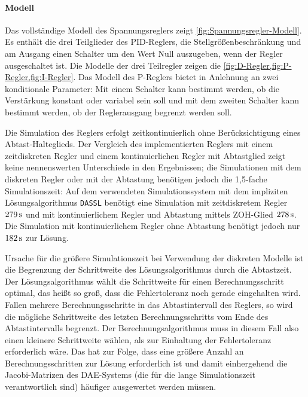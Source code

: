 \paragraph{Modell}\label{modell-Regler}
Das vollständige Modell des Spannungsreglers zeigt \cref{fig:Spannungsregler-Modell}. Es enthält die drei Teilglieder des PID-Reglers, die Stellgrößenbeschränkung und am Ausgang einen Schalter um den Wert Null auszugeben, wenn der Regler ausgeschaltet ist. Die Modelle der drei Teilregler zeigen die \cref{fig:D-Regler,fig:P-Regler,fig:I-Regler}. Das Modell des P-Reglers bietet in Anlehnung an \cite{pillerpowerssystemsDigitalerSpannungsreglerSoftwaredokumentation1997} zwei konditionale Parameter: Mit einem Schalter kann bestimmt werden, ob die Verstärkung konstant oder variabel sein soll und mit dem zweiten Schalter kann bestimmt werden, ob der Reglerausgang begrenzt werden soll. 

Die Simulation des Reglers erfolgt zeitkontinuierlich ohne Berücksichtigung eines Abtast-Halteglieds. Der Vergleich des implementierten Reglers mit einem zeitdiskreten Regler und einem kontinuierlichen Regler mit Abtastglied zeigt keine nennenswerten Unterschiede in den Ergebnissen; die Simulationen mit dem diskreten Regler oder mit der Abtastung benötigen jedoch die 1,5-fache Simulationszeit: Auf dem verwendeten Simulationssystem mit dem impliziten Lösungsalgorithmus \texttt{DASSL} benötigt eine Simulation mit zeitdiskretem Regler $\unit[279]{s}$ und mit kontinuierlichem Regler und Abtastung mittels ZOH-Glied $\unit[278]{s}$.  Die Simulation mit kontinuierlichem Regler ohne Abtastung benötigt jedoch nur $\unit[182]{s}$ zur Lösung. 

Ursache für die größere Simulationszeit bei Verwendung der diskreten Modelle ist die Begrenzung der Schrittweite des Lösungsalgorithmus durch die Abtastzeit. Der Lösungsalgorithmus wählt die Schrittweite für einen Berechnungsschritt optimal, das heißt so groß, dass die Fehlertoleranz noch gerade eingehalten wird. Fallen mehrere Berechnungsschritte in das Abtastintervall des Reglers, so wird die mögliche Schrittweite des letzten Berechnungsschritts vom Ende des Abtastintervalls begrenzt. Der Berechnungsalgorithmus muss in diesem Fall also einen kleinere Schrittweite wählen, als zur Einhaltung der Fehlertoleranz erforderlich wäre. Das hat zur Folge, dass eine größere Anzahl an Berechnungsschritten zur Lösung erforderlich ist und damit einhergehend die Jacobi-Matrizen des DAE-Systems (die für die lange Simulationszeit verantwortlich sind) häufiger ausgewertet werden müssen. 

